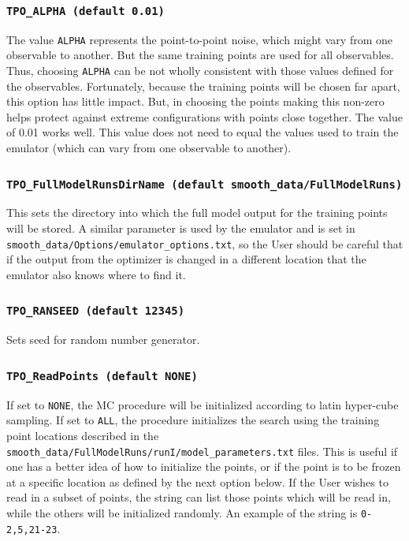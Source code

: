 \documentclass[UserManual.tex]{subfiles}
\begin{document}
\begin{sloppypar}
\subsubsection{{\tt TPO\_ALPHA (default 0.01)}}
The value {\tt ALPHA} represents the point-to-point noise, which might vary from one observable to another. But the same training points are used for all observables. Thus, choosing {\tt ALPHA} can be not wholly consistent with those values defined for the observables. Fortunately, because the training points will be chosen far apart, this option has little impact. But, in choosing the points making this non-zero helps protect against extreme configurations with points close together. The value of 0.01 works well. This value does not need to equal the values used to train the emulator (which can vary from one observable to another).

\subsubsection{{\tt TPO\_FullModelRunsDirName (default smooth\_data/FullModelRuns)}}
This sets the directory into which the full model output for the training points will be stored. A similar parameter is used by the emulator and is set in {\tt smooth\_data/Options/emulator\_options.txt}, so the User should be careful that if the output from the optimizer is changed in a different location that the emulator also knows where to find it.

\subsubsection{{\tt TPO\_RANSEED (default 12345)}}
Sets seed for random number generator.

\subsubsection{{\tt TPO\_ReadPoints (default NONE)}}
If set to {\tt NONE}, the MC procedure will be initialized according to latin hyper-cube sampling. If set to {\tt ALL}, the procedure initializes the search using the training point locations described in the {\tt smooth\_data/FullModelRuns/runI/model\_parameters.txt} files. This is useful if one has a better idea of how to initialize the points, or if the point is to be frozen at a specific location as defined by the next option below. If the User wishes to read in a subset of points, the string can list those points which will be read in, while the others will be initialized randomly. An example of the string is {\tt 0-2,5,21-23}.


\end{sloppypar}
\end{document}
